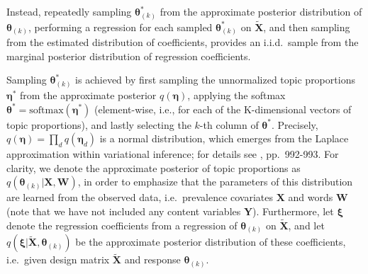 Instead, repeatedly sampling $\boldsymbol{\theta}_{(k)}^*$ from the approximate posterior distribution of $\boldsymbol{\theta}_{(k)}$, performing a regression for each sampled $\boldsymbol{\theta}_{(k)}^*$ on $\tilde{\boldsymbol{X}}$, and then sampling from the estimated distribution of coefficients, provides an i.i.d.\ sample from the marginal posterior distribution of regression coefficients. 

Sampling $\boldsymbol{\theta}_{(k)}^*$ is achieved by first sampling the unnormalized topic proportions $\boldsymbol{\eta}^*$ from the approximate posterior $q(\boldsymbol{\eta})$, applying the softmax $\boldsymbol{\theta}^* = \text{softmax}(\boldsymbol{\eta}^*)$ (element-wise, i.e., for each of the K-dimensional vectors of topic proportions), and lastly selecting the $k$-th column of $\boldsymbol{\theta}^*$. Precisely, $q(\boldsymbol{\eta}) = \prod_d q(\boldsymbol{\eta}_d)$ is a normal distribution, which emerges from the Laplace approximation within variational inference; for details see \cite{roberts2016model}, pp.\ 992-993. For clarity, we denote the approximate posterior of topic proportions as $q(\boldsymbol{\theta}_{(k)} | \boldsymbol{X}, \boldsymbol{W})$, in order to emphasize that the parameters of this distribution are learned from the observed data, i.e.\ prevalence covariates $\boldsymbol{X}$ and words $\boldsymbol{W}$ (note that we have not included any content variables $\boldsymbol{Y}$). Furthermore, let $\boldsymbol{\xi}$ denote the regression coefficients from a regression of $\boldsymbol{\theta}_{(k)}$ on $\tilde{\boldsymbol{X}}$, and let $q(\boldsymbol{\xi} | \tilde{\boldsymbol{X}}, \boldsymbol{\theta}_{(k)})$ be the approximate posterior distribution of these coefficients, i.e.\ given design matrix $\tilde{\boldsymbol{X}}$ and response $\boldsymbol{\theta}_{(k)}$.

